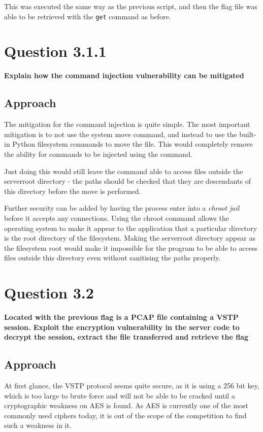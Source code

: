 This was executed the same way as the previous script, and then the flag file
was able to be retrieved with the \texttt{get} command as before.

\section{Question 3.1.1}
\textbf{Explain how the command injection vulnerability can be mitigated}
\subsection{Approach}
The mitigation for the command injection is quite simple. The most important
mitigation is to not use the system move command, and instead to use the
built-in Python filesystem commands to move the file. This would completely
remove the ability for commands to be injected using the command.

Just doing this would still leave the command able to access files outside the
serverroot directory - the paths should be checked that they are descendants
of this directory before the move is performed.

Further security can be added by having the process enter into a 
\textit{chroot jail} before it accepts any connections. Using the chroot command
allows the operating system to make it appear to the application that a 
particular directory is the root directory of the filesystem. Making the
serverroot directory appear as the filesystem root would make it impossible for
the program to be able to access files outside this directory even without
sanitising the paths properly.

\section{Question 3.2}
\textbf{Located with the previous flag is a PCAP file containing a VSTP session.
Exploit the encryption vulnerability in the server code to decrypt the session,
extract the file transferred and retrieve the flag}
\subsection{Approach}
At first glance, the VSTP protocol seems quite secure, as it is using a 256
bit key, which is too large to brute force and will not be able to be cracked
until a cryptographic weakness on AES is found. As AES is currently one of the
most commonly used ciphers today, it is out of the scope of the competition to
find such a weakness in it.

